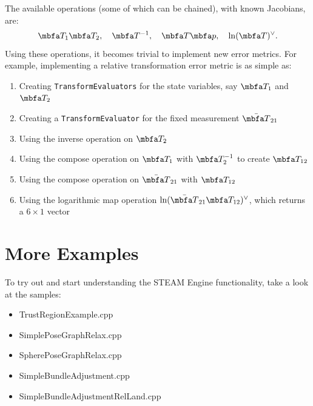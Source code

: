 \documentclass[10pt,letterpaper,fleqn,oneside]{article}
\newcommand{\code}[1]{\texttt{#1}}
\begin{document}
\noindent The available operations (some of which can be chained), with known Jacobians, are:
%
\begin{equation}
\mbf{T}_1 \mbf{T}_2, \quad
\mbf{T}^{-1}, \quad
\mbf{T}\mbf{p}, \quad
\ln(\mbf{T})^\vee.
\end{equation}
%
Using these operations, it becomes trivial to implement new error metrics.
For example, implementing a relative transformation error metric is as simple as:
%
\begin{enumerate}
\item Creating \code{TransformEvaluators} for the state variables, say $\mbf{T}_1$ and $\mbf{T}_2$
\item Creating a \code{TransformEvaluator} for the fixed measurement $\mbfbar{T}_{21}$
\item Using the inverse operation on $\mbf{T}_2$
\item Using the compose operation on $\mbf{T}_1$ with $\mbf{T}_2^{-1}$ to create $\mbf{T}_{12}$
\item Using the compose operation on $\mbfbar{T}_{21}$ with $\mbf{T}_{12}$
\item Using the logarithmic map operation $\ln(\mbfbar{T}_{21} \mbf{T}_{12})^\vee$, which returns a $6 \times 1$ vector
\end{enumerate}

%
%
\section{More Examples}

To try out and start understanding the STEAM Engine functionality, take a look at the samples:
\begin{itemize}
	\item TrustRegionExample.cpp
	\item SimplePoseGraphRelax.cpp
	\item SpherePoseGraphRelax.cpp
	\item SimpleBundleAdjustment.cpp
	\item SimpleBundleAdjustmentRelLand.cpp
\end{itemize}
\end{document}

